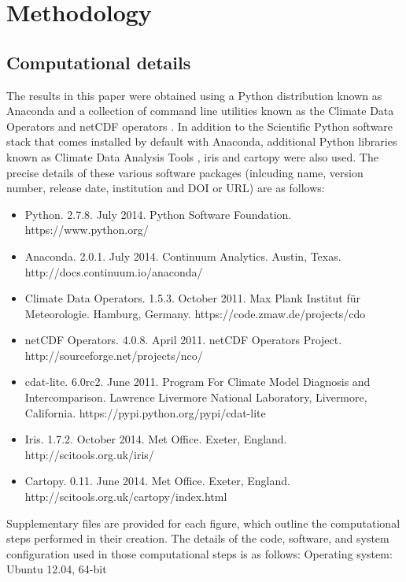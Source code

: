 \section{Methodology}\label{s:methodology}

\subsection{Computational details}\label{s:computational_details}

The results in this paper were obtained using a Python distribution known as Anaconda and a collection of command line utilities known as the Climate Data Operators \citep[CDO;][]{Schulzweida2014} and netCDF operators \citep[NCO;][]{Zender2014}. In addition to the Scientific Python \citep[SciPy;][]{SciPy} software stack that comes installed by default with Anaconda, additional Python libraries known as Climate Data Analysis Tools \citep[CDAT;][]{Doutriaux2009}, iris \citep{Iris} and cartopy \citep{Cartopy} were also used. The precise details of these various software packages (inlcuding name, version number, release date, institution and DOI or URL) are as follows:
\begin{itemize}
\item Python. 2.7.8. July 2014. Python Software Foundation. https://www.python.org/
\item Anaconda. 2.0.1. July 2014. Continuum Analytics. Austin, Texas. http://docs.continuum.io/anaconda/
\item Climate Data Operators. 1.5.3. October 2011. Max Plank Institut f{\"u}r Meteorologie. Hamburg, Germany. https://code.zmaw.de/projects/cdo
\item netCDF Operators. 4.0.8. April 2011. netCDF Operators Project. http://sourceforge.net/projects/nco/
\item cdat-lite. 6.0rc2. June 2011. Program For Climate Model Diagnosis and Intercomparison. Lawrence Livermore National Laboratory, Livermore, California. https://pypi.python.org/pypi/cdat-lite
\item Iris. 1.7.2. October 2014. Met Office. Exeter, England. http://scitools.org.uk/iris/
\item Cartopy. 0.11. June 2014. Met Office. Exeter, England. http://scitools.org.uk/cartopy/index.html
\end{itemize}

Supplementary files are provided for each figure, which outline the computational steps performed in their creation. The details of the code, software, and system configuration used in those computational steps is as follows:   
Operating system: Ubuntu 12.04, 64-bit %



